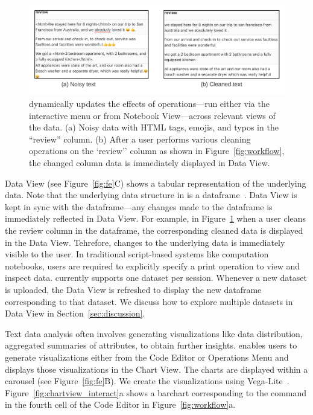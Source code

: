 \begin{figure}[!htb] 
  \centering
  \includegraphics[width=\linewidth]{figures/data_view_clean.pdf}
  \caption{\small \system dynamically updates the effects of operations---run either via the interactive menu or from Notebook View---across relevant views of the data. (a) Noisy data with HTML tags, emojis, and typos in the ``review'' column. (b) After a user performs various cleaning operations on the `review'' column as shown in Figure~\ref{fig:workflow}, the changed column data is immediately displayed in Data View. \label{fig:dataview}} 
\end{figure}

Data View (see Figure~\ref{fig:fe}C) shows a tabular representation of the underlying data. Note that the underlying data structure in \system is a dataframe~\cite{rahman2020leam}. Data View is kept in sync with the dataframe---any changes made to the dataframe is immediately reflected in Data View. For example, in Figure~\ref{fig:dataview} when a user cleans the review column in the dataframe, the corresponding cleaned data is displayed in the Data View. Tehrefore, changes to the underlying data is immediately visible to the user. In traditional script-based systems like computation notebooks, users are required to explicitly specify a print operation to view and inspect data. \system currently supports one dataset per session. Whenever a new dataset is uploaded, the Data View is refreshed to display the new dataframe corresponding to that dataset. We discuss how to explore multiple datasets in Data View in Section~\ref{sec:discussion}. 

Text data analysis often involves generating visualizations like data distribution, aggregated summaries of attributes, to obtain further insights.
\system enables users to generate visualizations either from the Code Editor or Operations Menu and displays those visualizations in the Chart View. The charts are displayed within a carousel (see Figure~\ref{fig:fe}B). We create the visualizations using Vega-Lite~\cite{satyanarayan2016vega}. Figure~\ref{fig:chartview_interact}a shows a barchart corresponding to the \vital command in the fourth cell of the Code Editor in Figure~\ref{fig:workflow}a.

